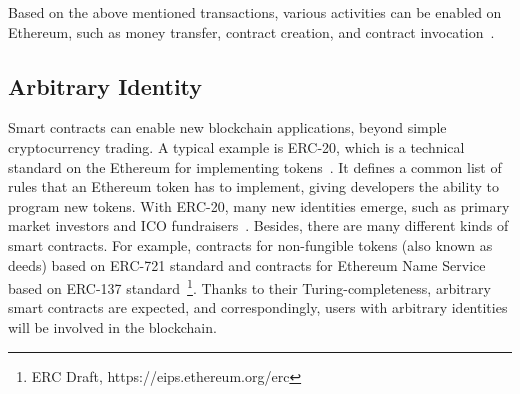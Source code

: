 



Based on the above mentioned transactions, various activities can be enabled on Ethereum, such as money transfer, contract creation, and contract invocation~\cite{chen2018infocom}.


\subsection{Arbitrary Identity}
Smart contracts can enable new blockchain applications, beyond simple cryptocurrency trading. A typical example is ERC-20, which is a technical standard on the Ethereum for implementing tokens~\cite{erc-20-wiki}. It defines a common list of rules that an Ethereum token has to implement, giving developers the ability to program new tokens. With ERC-20, many new identities emerge, such as primary market investors and ICO fundraisers~\cite{cerchiello2018icos}. Besides, there are many different kinds of smart contracts. For example, contracts for non-fungible tokens (also known as deeds) based on ERC-721 standard and contracts for Ethereum Name Service based on ERC-137 standard~\footnote{ERC Draft, https://eips.ethereum.org/erc}. Thanks to their Turing-completeness, arbitrary smart contracts are expected, and correspondingly, users with arbitrary identities will be involved in the blockchain.

